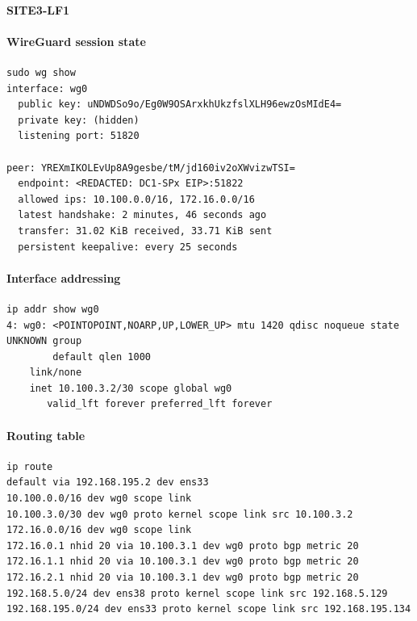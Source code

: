 \documentclass[11pt]{article}
\begin{document}
\paragraph{SITE3-LF1}

\paragraph{WireGuard session state}

\begin{verbatim}
sudo wg show
interface: wg0
  public key: uNDWDSo9o/Eg0W9OSArxkhUkzfslXLH96ewzOsMIdE4=
  private key: (hidden)
  listening port: 51820

peer: YREXmIKOLEvUp8A9gesbe/tM/jd160iv2oXWvizwTSI=
  endpoint: <REDACTED: DC1-SPx EIP>:51822
  allowed ips: 10.100.0.0/16, 172.16.0.0/16
  latest handshake: 2 minutes, 46 seconds ago
  transfer: 31.02 KiB received, 33.71 KiB sent
  persistent keepalive: every 25 seconds
\end{verbatim}

\paragraph{Interface addressing}

\begin{verbatim}
ip addr show wg0
4: wg0: <POINTOPOINT,NOARP,UP,LOWER_UP> mtu 1420 qdisc noqueue state UNKNOWN group
        default qlen 1000
    link/none
    inet 10.100.3.2/30 scope global wg0
       valid_lft forever preferred_lft forever
\end{verbatim}

\paragraph{Routing table}

\begin{verbatim}
ip route
default via 192.168.195.2 dev ens33
10.100.0.0/16 dev wg0 scope link
10.100.3.0/30 dev wg0 proto kernel scope link src 10.100.3.2
172.16.0.0/16 dev wg0 scope link
172.16.0.1 nhid 20 via 10.100.3.1 dev wg0 proto bgp metric 20
172.16.1.1 nhid 20 via 10.100.3.1 dev wg0 proto bgp metric 20
172.16.2.1 nhid 20 via 10.100.3.1 dev wg0 proto bgp metric 20
192.168.5.0/24 dev ens38 proto kernel scope link src 192.168.5.129
192.168.195.0/24 dev ens33 proto kernel scope link src 192.168.195.134
\end{verbatim}

%
%
\end{document}
